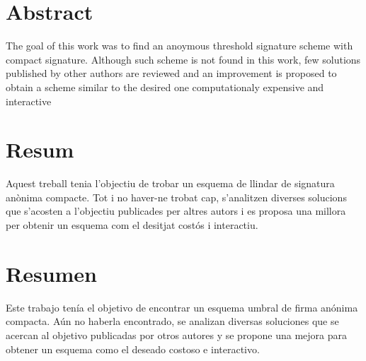 \section*{Abstract}

The goal of this work was to find an anoymous threshold signature scheme with compact signature. Although such scheme is not found in this work, few solutions published by other authors are reviewed and an improvement is proposed to obtain a scheme similar to the desired one computationaly expensive and interactive

\section*{Resum}

Aquest treball tenia l'objectiu de trobar un esquema de llindar de signatura an\`onima compacte. Tot i no haver-ne trobat cap, s'analitzen diverses solucions que s'acosten a l'objectiu publicades per altres autors i es proposa una millora per obtenir un esquema com el desitjat costós i interactiu.

\section*{Resumen}

Este trabajo tenía el objetivo de encontrar un esquema umbral de firma anónima compacta. Aún no haberla encontrado, se analizan diversas soluciones que se acercan al objetivo publicadas por otros autores y se propone una mejora para obtener un esquema como el deseado costoso e interactivo.